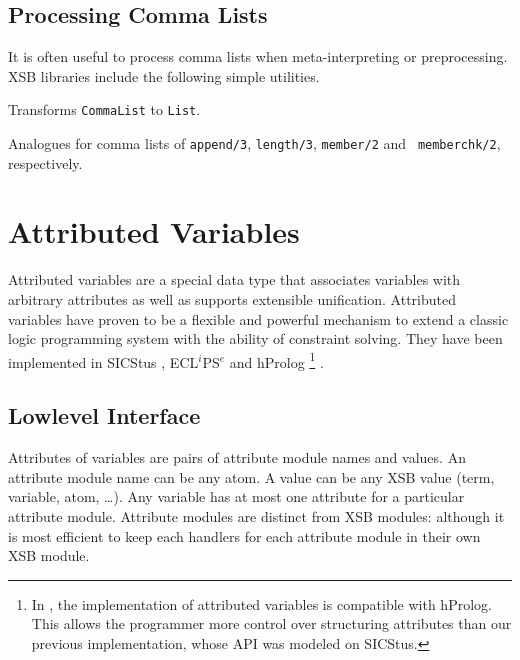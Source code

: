 \subsection{Processing Comma Lists}

It is often useful to process comma lists when meta-interpreting or
preprocessing.  XSB libraries include the following simple utilities.

\begin{description}

%
Transforms {\tt CommaList} to {\tt List}.

%
%
%
%
Analogues for comma lists of {\tt append/3}, {\tt length/3}, {\tt member/2} and {\tt
memberchk/2}, respectively.

\end{description}
	
\section{Attributed Variables} \label{sec:attributed-variables}

Attributed variables are a special data type that associates variables
with arbitrary attributes as well as supports extensible unification.
Attributed variables have proven to be a flexible and powerful
mechanism to extend a classic logic programming system with the
ability of constraint solving.  They have been implemented in SICStus
\cite{sicstus-manual}, ECL$^i$PS$^e$ \cite{eclipse-manual} and
hProlog \footnote{In \version, the implementation of attributed
  variables is compatible with hProlog.  This allows the programmer
  more control over structuring attributes than our previous
  implementation, whose API was modeled on SICStus.}  \cite{hprolog}.

\subsection{Lowlevel Interface}
%
Attributes of variables are pairs of attribute module names and
values.  An attribute module name can be any atom.  A value can be any
XSB value (term, variable, atom, \ldots). Any variable has at most one
attribute for a particular attribute module.  Attribute modules are
distinct from XSB modules: although it is most efficient to keep each
handlers for each attribute module in their own XSB module.


